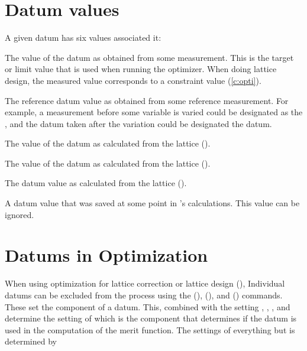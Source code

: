 \section{Datum values}
\label{s:datum.values}

A given datum has six values associated it:
\vspace{-2ex}
\begin{description}
  \vspace{-1ex}
  \item[meas] \Newline 
The value of the datum as obtained from some measurement. This is the
target or limit value that is used when running the optimizer. When
doing lattice design, the measured value corresponds to a constraint
value (\ref{c:opti}).
  \vspace{-1ex}
  \item[ref] \Newline
The reference datum value as obtained from some reference measurement. For example,
a measurement before some variable is varied could be designated as
the , and the datum taken after the variation could be 
designated the  datum.
  \vspace{-0.5ex}
  \item[model] \Newline
The value of the datum as calculated from the  lattice ().
  \vspace{-0.5ex}
  \item[design] \Newline
The value of the datum as calculated from the  lattice ().
  \vspace{-0.5ex}
  \item[base] \Newline
The datum value as calculated from the  lattice ().
  \vspace{-0.5ex}
  \item[old] \Newline
A datum value that was saved at some point in \tao's calculations. This value
can be ignored.
\end{description}

\section{Datums in Optimization}
\label{s:datum.opt}

When using optimization for lattice correction or lattice design
(), Individual datums can be excluded from the process
using the  (),  (),
and  () commands. These set the 
component of a datum. This, combined with the setting ,
, , and 
determine the setting of  which is the component that
determines if the datum is used in the computation of the merit
function. The settings of everything but  is determined
by \tao


